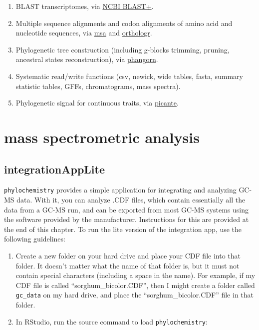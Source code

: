 \documentclass[
]{krantz}
\providecommand{\tightlist}{%
  \setlength{\itemsep}{0pt}\setlength{\parskip}{0pt}}
\begin{document}
\begin{enumerate}
\def\labelenumi{\arabic{enumi}.}
\tightlist
\item
  BLAST transcriptomes, via \href{https://blast.ncbi.nlm.nih.gov/Blast.cgi?PAGE_TYPE=BlastDocs\&DOC_TYPE=Download}{NCBI BLAST+}.
\item
  Multiple sequence alignments and codon alignments of amino acid and nucleotide sequences, via \href{https://bioconductor.org/packages/release/bioc/html/msa.html}{msa} and \href{https://github.com/HajkD/orthologr}{orthologr}.
\item
  Phylogenetic tree construction (including g-blocks trimming, pruning, ancestral states reconstruction), via \href{https://cran.r-project.org/web/packages/phangorn/index.html}{phangorn}.
\item
  Systematic read/write functions (csv, newick, wide tables, fasta, summary statistic tables, GFFs, chromatograms, mass spectra).
\item
  Phylogenetic signal for continuous traits, via \href{https://cran.r-project.org/web/packages/picante/index.html}{picante}.
\end{enumerate}

\hypertarget{mass-spectrometric-analysis}{%
\section{mass spectrometric analysis}\label{mass-spectrometric-analysis}}

\hypertarget{integrationapplite}{%
\subsection{integrationAppLite}\label{integrationapplite}}

\texttt{phylochemistry} provides a simple application for integrating and analyzing GC-MS data. With it, you can analyze .CDF files, which contain essentially all the data from a GC-MS run, and can be exported from most GC-MS systems using the software provided by the manufacturer. Instructions for this are provided at the end of this chapter. To run the lite version of the integration app, use the following guidelines:

\begin{enumerate}
\def\labelenumi{\arabic{enumi}.}
\item
  Create a new folder on your hard drive and place your CDF file into that folder. It doesn't matter what the name of that folder is, but it must not contain special characters (including a space \texttt{} in the name). For example, if my CDF file is called ``sorghum\_bicolor.CDF'', then I might create a folder called \texttt{gc\_data} on my hard drive, and place the ``sorghum\_bicolor.CDF'' file in that folder.
\item
  In RStudio, run the source command to load \texttt{phylochemistry}:
\end{enumerate}
\end{document}
